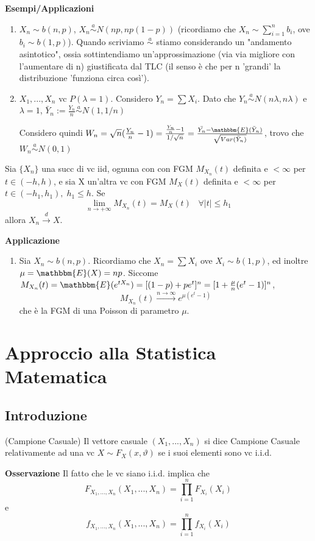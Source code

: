 \textbf{Esempi/Applicazioni}
\begin{enumerate}
\item $X_n \sim b(n,p)$, $X_n \stackrel{a}{\sim}N(np,np(1-p))$ (ricordiamo che $X_n \sim \sum_{i=1}^n b_i$, ove $b_i \sim b(1,p)$).
Quando scriviamo $\stackrel{a}{\sim}$ stiamo considerando un "andamento asintotico", ossia sottintendiamo un'approssimazione (via via migliore con l'aumentare di n) giustificata dal TLC (il senso è che per n 'grandi' la distribuzione 'funziona circa così').
\item $X_1,...,X_n$ vc 
$P(\lambda =1)$. 
Considero $Y_n=\sum X_i$.
Dato che $Y_n \stackrel{a}
{\sim} N(n\lambda ,n \lambda )$ e $\lambda=1$,
 $\bar{Y}_n:=\frac{Y_n}{n} \stackrel{a}
 {\sim} N(1,1/n)$

 Considero quindi $W_n=\sqrt{n}(\frac{Y_n}{n}-1)=\frac{\frac{Y_n}{n}-1}
{1/\sqrt{n}}=\frac{\bar{Y_n} - \mathbbm{E}(\bar{Y}_n)}
{\sqrt{Var(\bar{Y}_n)}}$, trovo che $W_n \stackrel{a}{\sim} N(0,1) $
\end{enumerate}

\begin{teo}
Sia $\{X_n\}$ una succ di vc iid, ognuna con con FGM $M_{X_n}(t)$ definita e $<\infty$ per $t\in(-h,h)$, e sia X un'altra vc con FGM $M_X(t)$ definita e $<\infty$ per $t \in (-h_1,h_1), \; h_1\leq h$. Se $$\lim_{n \rightarrow +\infty} M_{X_n}(t)=M_X(t) \; \; \; \forall |t| \leq h_1$$ allora $X_n \stackrel{d}{\rightarrow} X$.
\end{teo}
\textbf{Applicazione}
\begin{enumerate}
\item Sia $X_n \sim b(n,p)$. 
Ricordiamo che $X_n=\sum X_i$ ove $X_i \sim b(1,p)$, ed inoltre $\mu=\mathbbm{E}(X)=np$.
Siccome $M_{X_n}(t)=
\mathbbm{E}(e^{tX_n})=[(1-p)+pe^t]^n=
[1+\frac{\mu}{n}(e^t - 1)]^n$, 
$$ M_{X_n}(t) \stackrel{n \rightarrow \infty}{\longrightarrow} 
e^{\mu(e^t-1)}$$
che è la FGM di una Poisson di parametro $\mu$.
\end{enumerate}
\section{Approccio alla Statistica Matematica}

\subsection{Introduzione}

\begin{definizione} (Campione Casuale)
Il vettore casuale $(X_1,...,X_n)$ si dice Campione Casuale relativamente ad una vc $X \sim F_X(x,\vartheta)$ se i suoi elementi sono vc i.i.d.
\end{definizione}
\textbf{Osservazione}
Il fatto che le vc siano i.i.d. implica che $$F_{X_1,...,X_n}(X_1,...,X_n)=\prod_{i=1}^n F_{X_i} (X_i)$$ e $$f_{X_1,...,X_n}(X_1,...,X_n)=\prod_{i=1}^n f_{X_i} (X_i)$$

